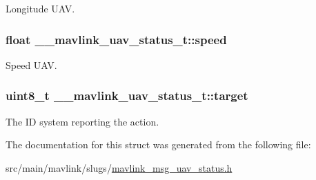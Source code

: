 Longitude U\+A\+V. 

\hypertarget{struct____mavlink__uav__status__t_a0681bd3a2d027d681a2f903458af004a}{
\subsubsection[{speed}]{\setlength{\rightskip}{0pt plus 5cm}float \+\_\+\+\_\+mavlink\+\_\+uav\+\_\+status\+\_\+t\+::speed}}\label{struct____mavlink__uav__status__t_a0681bd3a2d027d681a2f903458af004a}


Speed U\+A\+V. 

\hypertarget{struct____mavlink__uav__status__t_a7202983a31239d9f6ef60fa66674721e}{
\subsubsection[{target}]{\setlength{\rightskip}{0pt plus 5cm}uint8\+\_\+t \+\_\+\+\_\+mavlink\+\_\+uav\+\_\+status\+\_\+t\+::target}}\label{struct____mavlink__uav__status__t_a7202983a31239d9f6ef60fa66674721e}


The I\+D system reporting the action. 



The documentation for this struct was generated from the following file\+:\begin{DoxyCompactItemize}
\item 
src/main/mavlink/slugs/\hyperlink{mavlink__msg__uav__status_8h}{mavlink\+\_\+msg\+\_\+uav\+\_\+status.\+h}\end{DoxyCompactItemize}
